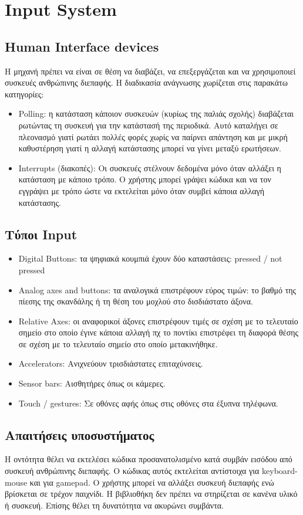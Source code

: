 	\section{Input System}
	\subsection{Human Interface devices}
	Η μηχανή πρέπει να είναι σε θέση να διαβάζει, να επεξεργάζεται και να χρησιμοποιεί συσκευές ανθρώπινης διεπαφής. Η διαδικασία ανάγνωσης χωρίζεται στις παρακάτω κατηγορίες:
	\begin{itemize}
	\item Polling: η κατάσταση κάποιον συσκευών (κυρίως της παλιάς σχολής) διαβάζεται ρωτώντας τη συσκευή για την κατάστασή της περιοδικά. Αυτό καταλήγει σε πλεονασμό γιατί ρωτάει πολλές φορές χωρίς να παίρνει απάντηση και με μικρή καθυστέρηση γιατί η αλλαγή κατάστασης μπορεί να γίνει μεταξύ ερωτήσεων.
	\item Interrupts (διακοπές): Οι συσκευές στέλνουν δεδομένα μόνο όταν αλλάξει η κατάσταση με κάποιο τρόπο. Ο χρήστης μπορεί γράψει κώδικα και να τον εγγράψει με τρόπο ώστε να εκτελείται μόνο όταν συμβεί κάποια αλλαγή κατάστασης.
	\end{itemize}
	
	\subsection{Τύποι Input}
	
	\begin{itemize}	
	\item Digital Buttons: τα ψηφιακά κουμπιά έχουν δύο καταστάσεις: pressed / not pressed
	\item Analog axes and buttons: τα αναλογικά επιστρέφουν εύρος τιμών: το βαθμό της πίεσης της σκανδάλης ή τη θέση του μοχλού στο δισδιάστατο άξονα. 
	\item Relative Axes: οι αναφορικοί άξονες επιστρέφουν τιμές σε σχέση με το τελευταίο σημείο στο οποίο έγινε κάποια αλλαγή πχ το ποντίκι επιστρέφει τη διαφορά θέσης σε σχέση με το τελευταίο σημείο στο οποίο μετακινήθηκε.
	\item Accelerators: Ανιχνεύουν τρισδιάστατες επιταχύνσεις.
	\item Sensor bars: Αισθητήρες όπως οι κάμερες.
	\item Touch / gestures: Σε οθόνες αφής όπως στις οθόνες στα έξυπνα τηλέφωνα.
	\end{itemize}
	
	\subsection{Απαιτήσεις υποσυστήματος}
	Η οντότητα θέλει να εκτελέσει κώδικα προσανατολισμένο κατά συμβάν εισόδου από συσκευή ανθρώπινης διεπαφής. Ο κώδικας αυτός εκτελείται αντίστοιχα για keyboard-mouse και για gamepad. O χρήστης μπορεί να αλλάξει συσκευή διεπαφής ενώ βρίσκεται σε τρέχον παιχνίδι. Η βιβλιοθήκη δεν πρέπει να στηρίζεται σε κανένα υλικό ή συσκευή. Επίσης θέλει τη δυνατότητα να ακυρώνει συμβάντα.
	

